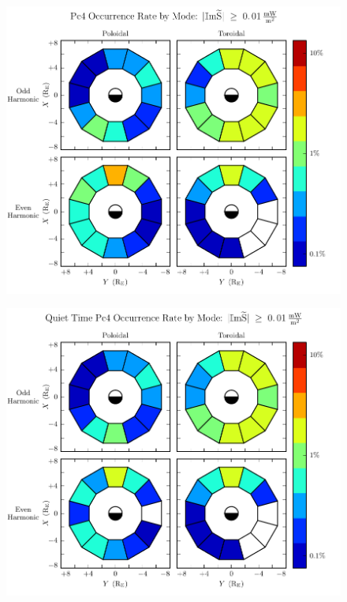 \begin{figure}[!htb]
    \centering
    \includegraphics[width=\textwidth]{figures/mode_all.pdf}
    \caption[Pc4 Rate by Mode]{
      \todo{$\cdots$}
    }
    \label{fig_mode_all}
\end{figure}

\begin{figure}[!htb]
    \centering
    \includegraphics[width=\textwidth]{figures/mode_calm.pdf}
    \caption[Pc4 Rate by Mode: Dst $\geq \SI{-30}{\nT}$]{
      \todo{$\cdots$}
    }
    \label{fig_mode_calm}
\end{figure}


